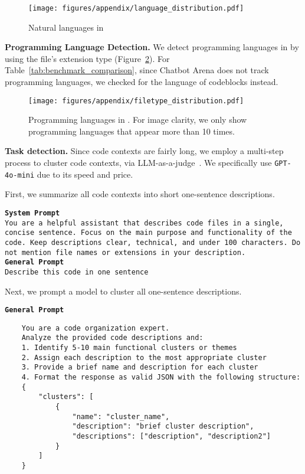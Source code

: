\begin{figure}[h]
    \centering
    \texttt{[image: figures/appendix/language\_distribution.pdf]}
    \caption{Natural languages in \systemName}
    \label{fig:nat_languages}
\end{figure}

\textbf{Programming Language Detection.}
We detect programming languages in \systemName by using the file's extension type (Figure~\ref{fig:prog_languages}).
For Table~\ref{tab:benchmark_comparison}, since Chatbot Arena does not track programming languages, we checked for the language of codeblocks instead.

\begin{figure}[h]
    \centering
    \texttt{[image: figures/appendix/filetype\_distribution.pdf]}
    \caption{Programming languages in \systemName. For image clarity, we only show programming languages that appear more than 10 times.}
    \label{fig:prog_languages}
\end{figure}

\newpage
\textbf{Task detection.} Since \systemName code contexts are fairly long, we employ a multi-step process to cluster code contexts, via LLM-as-a-judge~\citep{zheng2023judging}. We specifically use \texttt{GPT-4o-mini} due to its speed and price. 

First, we summarize all code contexts into short one-sentence descriptions.
\begin{tcolorbox}
\texttt{\textbf{System Prompt}} \\
\texttt{You are a helpful assistant that describes code files in a single, concise sentence.
Focus on the main purpose and functionality of the code.
Keep descriptions clear, technical, and under 100 characters.
Do not mention file names or extensions in your description.} \\

\texttt{\textbf{General Prompt}} \\
\texttt{Describe this code in one sentence}
\end{tcolorbox}


Next, we prompt a model to cluster all one-sentence descriptions.
\begin{tcolorbox}
\texttt{\textbf{General Prompt}} \\
\begin{verbatim}
    You are a code organization expert. 
    Analyze the provided code descriptions and:
    1. Identify 5-10 main functional clusters or themes
    2. Assign each description to the most appropriate cluster
    3. Provide a brief name and description for each cluster
    4. Format the response as valid JSON with the following structure:
    {
        "clusters": [
            {
                "name": "cluster_name",
                "description": "brief cluster description",
                "descriptions": ["description", "description2"]
            }
        ]
    }
\end{verbatim}
\end{tcolorbox}

